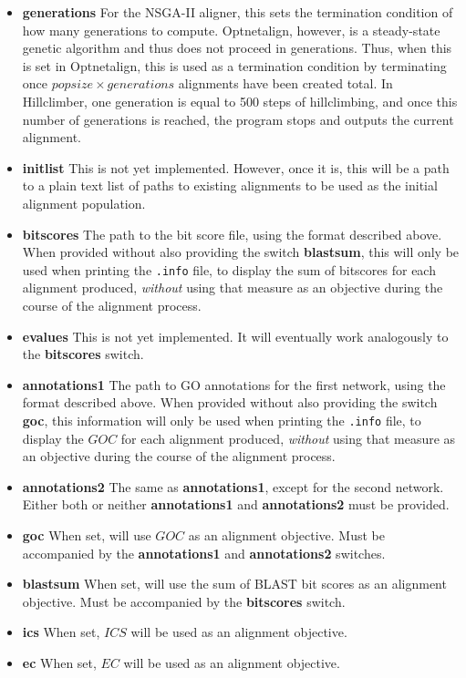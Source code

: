 \documentclass[11pt]{article} %
\begin{document}
\begin{itemize}
\item \textbf{generations} For the NSGA-II aligner, this sets the termination condition of how many generations to compute. Optnetalign, however, is a steady-state genetic algorithm and thus does not proceed in generations. Thus, when this is set in Optnetalign, this is used as a termination condition by terminating once \(popsize \times generations\) alignments have been created total. In Hillclimber, one generation is equal to 500 steps of hillclimbing, and once this number of generations is reached, the program stops and outputs the current alignment.
\item \textbf{initlist} This is not yet implemented. However, once it is, this will be a path to a plain text list of paths to existing alignments to be used as the initial alignment population.
\item \textbf{bitscores} The path to the bit score file, using the format described above. When provided without also providing the switch \textbf{blastsum}, this will only be used when printing the \texttt{.info} file, to display the sum of bitscores for each alignment produced, \textit{without} using that measure as an objective during the course of the alignment process. 
\item \textbf{evalues} This is not yet implemented. It will eventually work analogously to the \textbf{bitscores} switch.
\item \textbf{annotations1} The path to GO annotations for the first network, using the format described above. When provided without also providing the switch \textbf{goc}, this information will only be used when printing the \texttt{.info} file, to display the \(GOC\) for each alignment produced, \textit{without} using that measure as an objective during the course of the alignment process.
\item \textbf{annotations2} The same as \textbf{annotations1}, except for the second network. Either both or neither \textbf{annotations1} and \textbf{annotations2} must be provided.
\item \textbf{goc} When set, will use \(GOC\) as an alignment objective. Must be accompanied by the \textbf{annotations1} and \textbf{annotations2} switches.
\item \textbf{blastsum} When set, will use the sum of BLAST bit scores as an alignment objective. Must be accompanied by the \textbf{bitscores} switch.
\item \textbf{ics} When set, \(ICS\) will be used as an alignment objective. 
\item \textbf{ec} When set, \(EC\) will be used as an alignment objective.

\end{itemize}
\end{document}
